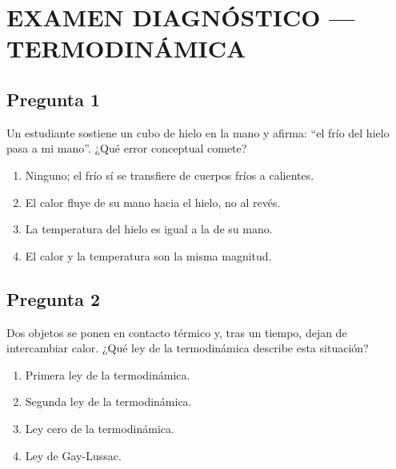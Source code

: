 \renewcommand{\tema}{Termodinámica}

\twocolumn

\section*{EXAMEN DIAGNÓSTICO — TERMODINÁMICA}


\begin{preguntabox}
\subsection*{Pregunta 1}
Un estudiante sostiene un cubo de hielo en la mano y afirma: ``el frío del hielo pasa a mi mano''. ¿Qué error conceptual comete?

\begin{enumerate}
    \item[A)] Ninguno; el frío sí se transfiere de cuerpos fríos a calientes.
    \item[B)] El calor fluye de su mano hacia el hielo, no al revés.
    \item[C)] La temperatura del hielo es igual a la de su mano.
    \item[D)] El calor y la temperatura son la misma magnitud.
\end{enumerate}
\end{preguntabox}

\begin{preguntabox}
\subsection*{Pregunta 2}
Dos objetos se ponen en contacto térmico y, tras un tiempo, dejan de intercambiar calor. ¿Qué ley de la termodinámica describe esta situación?

\begin{enumerate}
    \item[A)] Primera ley de la termodinámica.
    \item[B)] Segunda ley de la termodinámica.
    \item[C)] Ley cero de la termodinámica.
    \item[D)] Ley de Gay-Lussac.
\end{enumerate}
\end{preguntabox}

